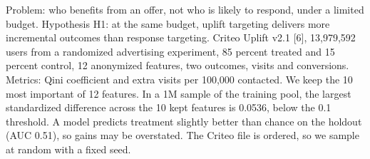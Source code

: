 Problem: who benefits from an offer, not who is likely to respond, under a limited budget. Hypothesis H1: at the same budget, uplift targeting delivers more incremental outcomes than response targeting. Criteo Uplift v2.1 [6], 13,979,592 users from a randomized advertising experiment, 85 percent treated and 15 percent control, 12 anonymized features, two outcomes, visits and conversions. Metrics: Qini coefficient and extra visits per 100,000 contacted. We keep the 10 most important of 12 features. In a 1M sample of the training pool, the largest standardized difference across the 10 kept features is 0.0536, below the 0.1 threshold. A model predicts treatment slightly better than chance on the holdout (AUC 0.51), so gains may be overstated. The Criteo file is ordered, so we sample at random with a fixed seed.
